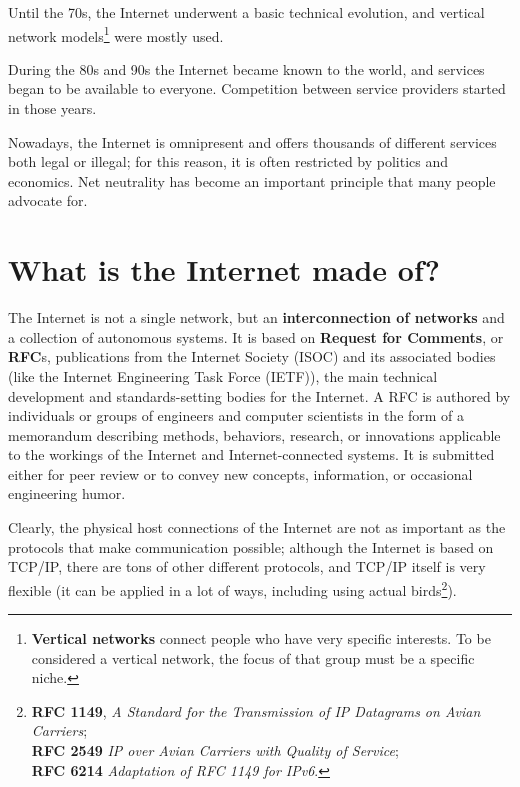 Until the 70s, the Internet underwent a basic technical evolution, and vertical network models\footnote{\textbf{Vertical networks} connect people who have very specific interests. To be considered a vertical network, the focus of that group must be a specific niche.} were mostly used.

During the 80s and 90s the Internet became known to the world, and services began to be available to everyone. Competition between service providers started in those years.

Nowadays, the Internet is omnipresent and offers thousands of different services both legal or illegal; for this reason, it is often restricted by politics and economics. Net neutrality has become an important principle that many people advocate for.


\section{What is the Internet made of?}
\label{sec:internetmadeof}
The Internet is not a single network, but an \textbf{interconnection of networks} and a collection of autonomous systems. It is based on \textbf{Request for Comments}, or \textbf{RFC}s, publications from the Internet Society (ISOC) and its associated bodies (like the Internet Engineering Task Force (IETF)), the main technical development and standards-setting bodies for the Internet. A RFC is authored by individuals or groups of engineers and computer scientists in the form of a memorandum describing methods, behaviors, research, or innovations applicable to the workings of the Internet and Internet-connected systems. It is submitted either for peer review or to convey new concepts, information, or occasional engineering humor.

Clearly, the physical host connections of the Internet are not as important as the protocols that make communication possible; although the Internet is based on TCP/IP, there are tons of other different protocols, and TCP/IP itself is very flexible (it can be applied in a lot of ways, including using actual birds\footnote{\label{foot:birds}\textbf{RFC 1149}, \textit{A Standard for the Transmission of IP Datagrams on Avian Carriers};\\\textbf{RFC 2549} \textit{IP over Avian Carriers with Quality of Service};\\ \textbf{RFC 6214} \textit{Adaptation of RFC 1149 for IPv6}.}).

